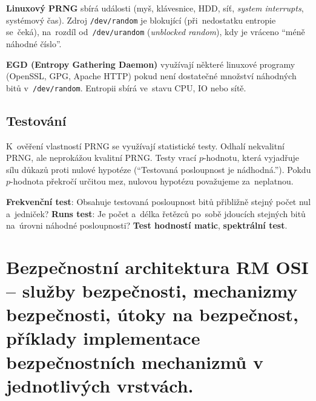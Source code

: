 \textbf{Linuxový PRNG} sbírá události (myš, klávesnice, HDD, síť, \emph{system interrupts}, systémový čas). Zdroj \texttt{/dev/random} je blokující (při~nedostatku entropie se~čeká), na~rozdíl od~\texttt{/dev/urandom} (\emph{unblocked random}), kdy je vráceno \enquote{méně náhodné číslo}.

\textbf{EGD (Entropy Gathering Daemon)} využívají některé linuxové programy (OpenSSL, GPG, Apache HTTP) pokud není dostatečné množství náhodných bitů v~\texttt{/dev/random}. Entropii sbírá ve~stavu CPU, IO nebo sítě.

\subsection{Testování}

K~ověření vlastností PRNG se využívají statistické testy. Odhalí nekvalitní PRNG, ale neprokážou kvalitní PRNG. Testy vrací $p$-hodnotu, která vyjadřuje sílu důkazů proti nulové hypotéze (\enquote{Testovaná posloupnost je nádhodná.}). Pokdu $p$-hodnota překročí určitou mez, nulovou hypotézu považujeme za~neplatnou.

\textbf{Frekvenční test}: Obsahuje testovaná posloupnost bitů přibližně stejný počet nul a~jedniček? \textbf{Runs test}: Je počet a~délka řetězců po~sobě jdoucích stejných bitů na~úrovni náhodné posloupnosti? \textbf{Test hodností matic}, \textbf{spektrální test}.

\clearpage
\section{Bezpečnostní architektura RM OSI -- služby bezpečnosti, mechanizmy bezpečnosti, útoky na bezpečnost, příklady implementace bezpečnostních mechanizmů v jednotlivých vrstvách.}
